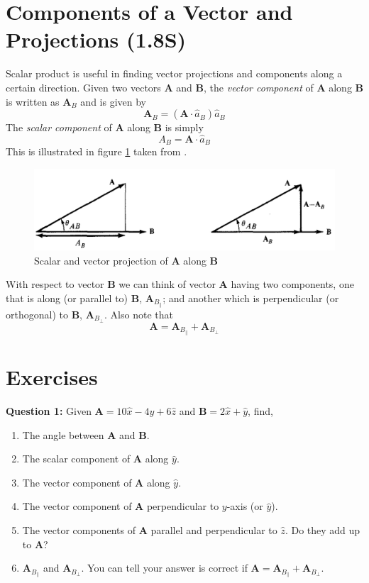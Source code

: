 \documentclass[12pt,a4paper]{article}
\begin{document}
\section{Components of a Vector and Projections (1.8S)}
Scalar product is useful in finding vector projections and components along a certain direction. Given two vectors \textbf{A} and \textbf{B}, the \textit{vector component} of \textbf{A} along \textbf{B} is written as $\textbf{A}_B$ and is given by
\begin{equation}
\textbf{A}_B=(\textbf{A}\cdot \hat{a}_B)\hat{a}_B
\end{equation}
The \textit{scalar component} of \textbf{A} along \textbf{B} is simply
\begin{equation}
A_B=\textbf{A}\cdot \hat{a}_B
\end{equation}
This is illustrated in figure \ref{Scalar-vector-projections} taken from \cite[Figure 1.10, page 16]{Sadiku}.
\begin{figure}[H]
\includegraphics[scale=0.48]{Figure1-10S.png}
\caption{Scalar and vector projection of \textbf{A} along \textbf{B} \cite[Figure 1.10, page 16]{Sadiku}}
\label{Scalar-vector-projections}
\end{figure}
With respect to vector \textbf{B} we can think of vector \textbf{A} having two components, one that is along (or parallel to) \textbf{B}, $\textbf{A}_{B_\parallel}$; and another which is perpendicular (or orthogonal) to \textbf{B}, $\textbf{A}_{B_\perp}$. Also note that
\begin{equation}
\textbf{A}=\textbf{A}_{B_\parallel}+\textbf{A}_{B_\perp}
\end{equation}

\section{Exercises}
\noindent\textbf{Question 1:} Given $\textbf{A}=10\hat x-4\hat y+6\hat z$ and $\textbf{B}=2\hat x+\hat y$, find,
\begin{enumerate}
\item[(1)] The angle between \textbf{A} and \textbf{B}.
\item[(2)] The scalar component of \textbf{A} along $\hat y$.
\item[(3)] The vector component of \textbf{A} along $\hat y$.
\item[(4)] The vector component of \textbf{A} perpendicular to $y$-axis (or $\hat y$).
\item[(5)] The vector components of \textbf{A} parallel and perpendicular to $\hat z$. Do they add up to \textbf{A}?
\item[(6)] $\textbf{A}_{B_\parallel}$ and $\textbf{A}_{B_\perp}$. You can tell your answer is correct if $\textbf{A}=\textbf{A}_{B_\parallel}+\textbf{A}_{B_\perp}$.
\end{enumerate}



\end{document}

